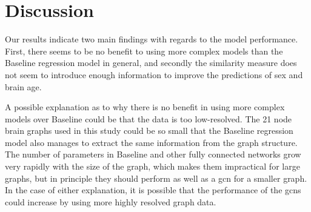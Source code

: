 \chapter{Discussion}
\label{chap:discussion}
    
Our results indicate two main findings with regards to the model performance. First, there seems to be no benefit to using more complex models than the Baseline regression model in general, and secondly the similarity measure does not seem to introduce enough information to improve the predictions of sex and brain age.


A possible explanation as to why there is no benefit in using more complex models over Baseline could be that the data is too low-resolved. The 21 node brain graphs used in this study could be so small that the Baseline regression model also manages to extract the same information from the graph structure. The number of parameters in Baseline and other fully connected networks grow very rapidly with the size of the graph, which makes them impractical for large graphs, but in principle they should perform as well as a \acrshort{gcn} for a smaller graph. In the case of either explanation, it is possible that the performance of the \acrshort{gcn}s could increase by using more highly resolved graph data.

